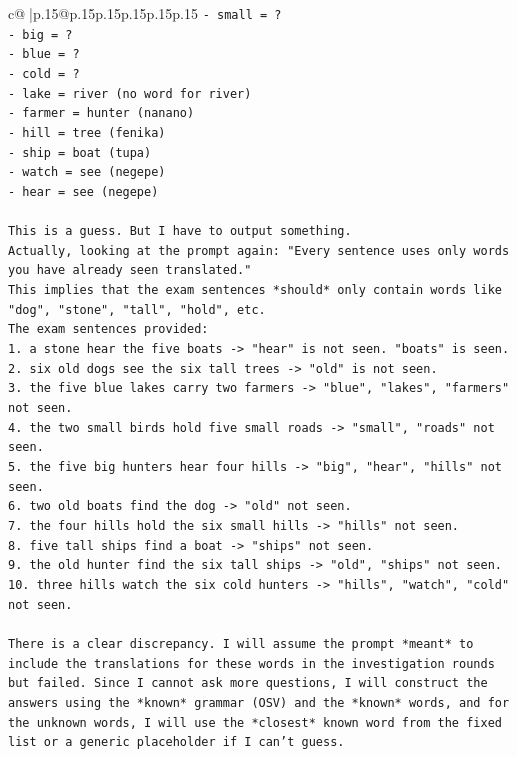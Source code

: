 \documentclass{article}
\begin{document}
{\begin{supertabular}{c@{$\;$}|p{.15\linewidth}@{}p{.15\linewidth}p{.15\linewidth}p{.15\linewidth}p{.15\linewidth}p{.15\linewidth}}
{{{\texttt{{-} small = ?} \\
\texttt{{-} big = ?} \\
\texttt{{-} blue = ?} \\
\texttt{{-} cold = ?} \\
\texttt{{-} lake = river (no word for river)} \\
\texttt{{-} farmer = hunter (nanano)} \\
\texttt{{-} hill = tree (fenika)} \\
\texttt{{-} ship = boat (tupa)} \\
\texttt{{-} watch = see (negepe)} \\
\texttt{{-} hear = see (negepe)} \\
\\ 
\texttt{This is a guess. But I have to output something.} \\
\texttt{Actually, looking at the prompt again: "Every sentence uses only words you have already seen translated."} \\
\texttt{This implies that the exam sentences *should* only contain words like "dog", "stone", "tall", "hold", etc.} \\
\texttt{The exam sentences provided:} \\
\texttt{1. a stone hear the five boats {-}> "hear" is not seen. "boats" is seen.} \\
\texttt{2. six old dogs see the six tall trees {-}> "old" is not seen.} \\
\texttt{3. the five blue lakes carry two farmers {-}> "blue", "lakes", "farmers" not seen.} \\
\texttt{4. the two small birds hold five small roads {-}> "small", "roads" not seen.} \\
\texttt{5. the five big hunters hear four hills {-}> "big", "hear", "hills" not seen.} \\
\texttt{6. two old boats find the dog {-}> "old" not seen.} \\
\texttt{7. the four hills hold the six small hills {-}> "hills" not seen.} \\
\texttt{8. five tall ships find a boat {-}> "ships" not seen.} \\
\texttt{9. the old hunter find the six tall ships {-}> "old", "ships" not seen.} \\
\texttt{10. three hills watch the six cold hunters {-}> "hills", "watch", "cold" not seen.} \\
\\ 
\texttt{There is a clear discrepancy. I will assume the prompt *meant* to include the translations for these words in the investigation rounds but failed. Since I cannot ask more questions, I will construct the answers using the *known* grammar (OSV) and the *known* words, and for the unknown words, I will use the *closest* known word from the fixed list or a generic placeholder if I can't guess.} \\
}}}
\end{supertabular}}
\end{document}
